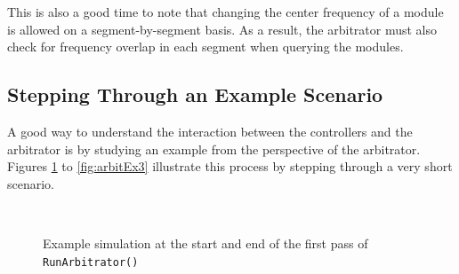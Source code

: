 This is also a good time to note that changing the center frequency
of a module is allowed on a segment-by-segment basis.  As a result,
the arbitrator must also check for frequency overlap in each segment
when querying the modules.

\subsection{Stepping Through an Example Scenario}

A good way to understand the interaction between the controllers and
the arbitrator is by studying an example from the perspective of the
arbitrator. Figures \ref{fig:arbitEx1} to \ref{fig:arbitEx3}
illustrate this process by stepping through a very short scenario.


\begin{figure}[!h]
\centering \mbox{
     \quad
} \caption[Arbitrator Example: Loop 1]{Example simulation at the
start and end of the first pass of \tt{RunArbitrator()}}
\label{fig:arbitEx1}
\end{figure}

